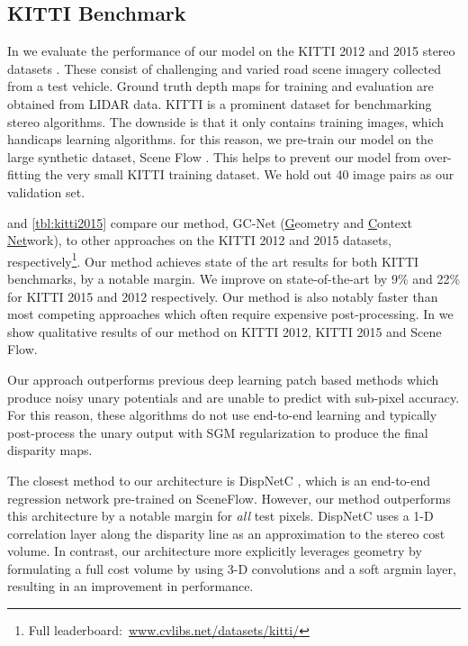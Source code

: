 \documentclass[10pt,twocolumn,letterpaper]{article}
\begin{document}
\subsection{KITTI Benchmark}
\label{sec:kitti_results}

In  we evaluate the performance of our model on the KITTI 2012 and 2015 stereo datasets \cite{Geiger2012CVPR,Menze2015CVPR}. These consist of challenging and varied road scene imagery collected from a test vehicle. Ground truth depth maps for training and evaluation are obtained from LIDAR data. KITTI is a prominent dataset for benchmarking stereo algorithms. The downside is that it only contains  training images, which handicaps learning algorithms. for this reason, we pre-train our model on the large synthetic dataset, Scene Flow \cite{MIFDB16}. This helps to prevent our model from over-fitting the very small KITTI training dataset. We hold out 40 image pairs as our validation set.

 and \ref{tbl:kitti2015} compare our method, GC-Net (\underline{G}eometry and \underline{C}ontext \underline{Net}work), to other approaches on the KITTI 2012 and 2015 datasets, respectively\footnote{Full leaderboard:~\url{www.cvlibs.net/datasets/kitti/}}. Our method achieves state of the art results for both KITTI benchmarks, by a notable margin. We improve on state-of-the-art by 9\% and 22\% for KITTI 2015 and 2012 respectively. Our method is also notably faster than most competing approaches which often require expensive post-processing. In  we show qualitative results of our method on KITTI 2012, KITTI 2015 and Scene Flow.

Our approach outperforms previous deep learning patch based methods \cite{zbontar2015computing,luo2016efficient} which produce noisy unary potentials and are unable to predict with sub-pixel accuracy. For this reason, these algorithms do not use end-to-end learning and typically post-process the unary output with SGM regularization \cite{einecke2015multi} to produce the final disparity maps.

The closest method to our architecture is DispNetC \cite{Mayer2015}, which is an end-to-end regression network pre-trained on SceneFlow. However, our method outperforms this architecture by a notable margin for \textit{all} test pixels. DispNetC uses a 1-D correlation layer along the disparity line as an approximation to the stereo cost volume. In contrast, our architecture more explicitly leverages geometry by formulating a full cost volume by using 3-D convolutions and a soft argmin layer, resulting in an improvement in performance.
\end{document}
